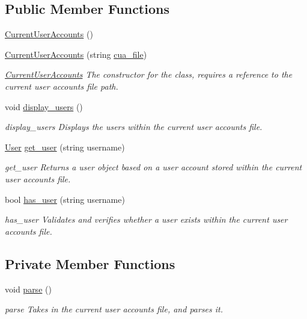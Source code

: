 \subsection*{Public Member Functions}
\begin{DoxyCompactItemize}
\item 
\hyperlink{class_current_user_accounts_a9476c00001c85287a6e15a04a2de2d69}{Current\-User\-Accounts} ()
\item 
\hyperlink{class_current_user_accounts_ac4d0c1a2716e7b618f784ac8f8b65f9e}{Current\-User\-Accounts} (string \hyperlink{class_current_user_accounts_a67f6b5fde524ca7c6a05222c7847b8f5}{cua\-\_\-file})
\begin{DoxyCompactList}\small\item\em \hyperlink{class_current_user_accounts}{Current\-User\-Accounts} The constructor for the class, requires a reference to the current user accounts file path. \end{DoxyCompactList}\item 
void \hyperlink{class_current_user_accounts_ad47cb0106d6f756714576cffabbf5b5b}{display\-\_\-users} ()
\begin{DoxyCompactList}\small\item\em display\-\_\-users Displays the users within the current user accounts file. \end{DoxyCompactList}\item 
\hyperlink{class_user}{User} \hyperlink{class_current_user_accounts_ade606d47cea348cdda1897591f88da82}{get\-\_\-user} (string username)
\begin{DoxyCompactList}\small\item\em get\-\_\-user Returns a user object based on a user account stored within the current user accounts file. \end{DoxyCompactList}\item 
bool \hyperlink{class_current_user_accounts_a7c28a4151fa81eaecd599aa4f4525df2}{has\-\_\-user} (string username)
\begin{DoxyCompactList}\small\item\em has\-\_\-user Validates and verifies whether a user exists within the current user accounts file. \end{DoxyCompactList}\end{DoxyCompactItemize}
\subsection*{Private Member Functions}
\begin{DoxyCompactItemize}
\item 
void \hyperlink{class_current_user_accounts_ad7c704b34912678d95c13243cacf9d7f}{parse} ()
\begin{DoxyCompactList}\small\item\em parse Takes in the current user accounts file, and parses it. \end{DoxyCompactList}\end{DoxyCompactItemize}
